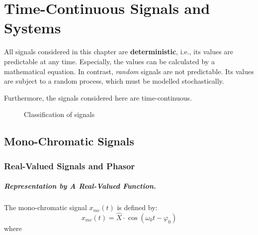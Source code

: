 \chapter{Time-Continuous Signals and Systems}

\begin{refsection}

All signals considered in this chapter are  \textbf{deterministic}, i.e., its values are predictable at any time. Especially, the values can be calculated by a mathematical equation. In contrast, \emph{random} signals are not predictable. Its values are subject to a random process, which must be modelled stochastically.

Furthermore, the signals considered here are time-continuous.

\begin{figure}[H]
	\centering
	\caption{Classification of signals}
	\label{fig:ch02:timecont_signals_classif}
\end{figure}

\section{Mono-Chromatic Signals}

\subsection{Real-Valued Signals and Phasor}

\paragraph{Representation by A Real-Valued Function.}

The mono-chromatic signal $x_{mc}(t)$ is defined by:
\begin{equation}
	x_{mc}(t) = \hat{X} \cdot \cos\left(\omega_0 t - \varphi_0\right)
	\label{eq:ch02:mono_chrom_eq}
\end{equation}
where


\end{refsection}

